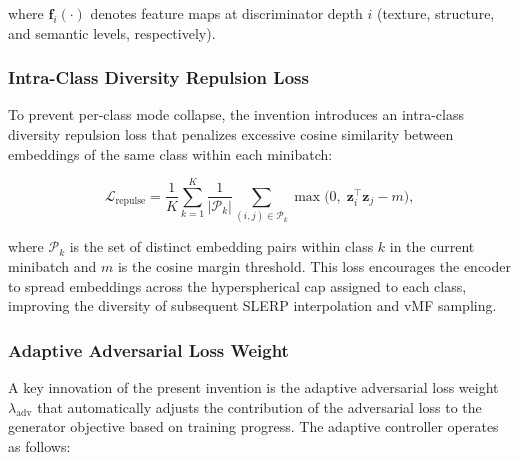 \documentclass[12pt,letterpaper]{article}
\newcommand{\bz}{\mathbf{z}}
\begin{document}
where $\mathbf{f}_i(\cdot)$ denotes feature maps at discriminator depth $i$
(texture, structure, and semantic levels, respectively).

\subsubsection{Intra-Class Diversity Repulsion Loss}

To prevent per-class mode collapse, the invention introduces an intra-class
diversity repulsion loss that penalizes excessive cosine similarity between
embeddings of the same class within each minibatch:

\begin{equation}
  \mathcal{L}_{\text{repulse}} = \frac{1}{K} \sum_{k=1}^{K}
    \frac{1}{|\mathcal{P}_k|} \sum_{(i,j) \in \mathcal{P}_k}
    \max\!\bigl(0,\; \bz_i^\top \bz_j - m\bigr),
  \label{eq:repulse}
\end{equation}

where $\mathcal{P}_k$ is the set of distinct embedding pairs within class
$k$ in the current minibatch and $m$ is the cosine margin threshold.  This
loss encourages the encoder to spread embeddings across the hyperspherical
cap assigned to each class, improving the diversity of subsequent SLERP
interpolation and vMF sampling.

\subsubsection{Adaptive Adversarial Loss Weight}

A key innovation of the present invention is the adaptive adversarial loss
weight $\lambda_{\text{adv}}$ that automatically adjusts the contribution
of the adversarial loss to the generator objective based on training
progress.  The adaptive controller operates as follows:
\end{document}
